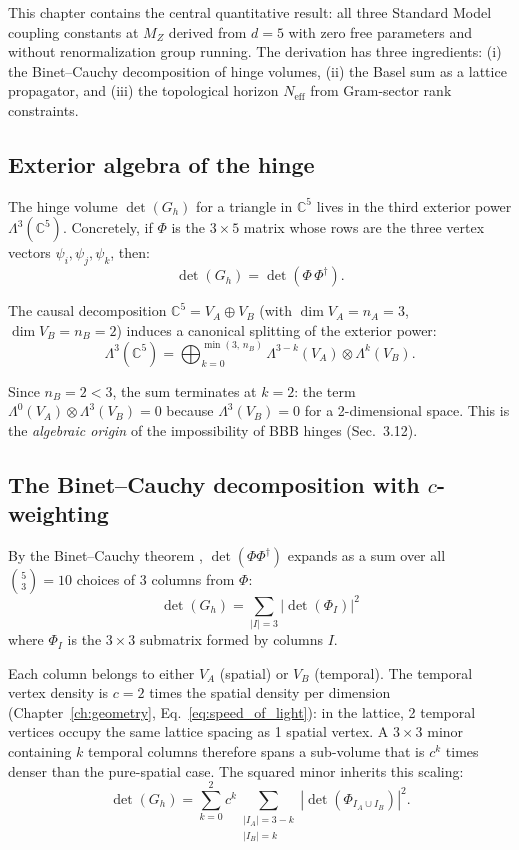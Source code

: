 \documentclass[12pt]{article}
\theoremstyle{remark}
\theoremstyle{definition}
\newcommand{\CC}{\mathbb{C}}
\begin{document}
This chapter contains the central quantitative result: all three Standard Model coupling constants at $M_Z$ derived from $d = 5$ with zero free parameters and without renormalization group running. The derivation has three ingredients: (i) the Binet--Cauchy decomposition of hinge volumes, (ii) the Basel sum as a lattice propagator, and (iii) the topological horizon $N_\text{eff}$ from Gram-sector rank constraints.

\subsection{Exterior algebra of the hinge}

The hinge volume $\det(G_h)$ for a triangle in $\CC^5$ lives in the third exterior power $\Lambda^3(\CC^5)$. Concretely, if $\Phi$ is the $3 \times 5$ matrix whose rows are the three vertex vectors $\psi_i, \psi_j, \psi_k$, then:
\begin{equation}
\det(G_h) = \det(\Phi\,\Phi^\dagger).
\end{equation}

The causal decomposition $\CC^5 = V_A \oplus V_B$ (with $\dim V_A = n_A = 3$, $\dim V_B = n_B = 2$) induces a canonical splitting of the exterior power:
\begin{equation}
\Lambda^3(\CC^5) = \bigoplus_{k=0}^{\min(3,\,n_B)} \Lambda^{3-k}(V_A) \otimes \Lambda^k(V_B).
\label{eq:exterior_split}
\end{equation}

Since $n_B = 2 < 3$, the sum terminates at $k = 2$: the term $\Lambda^0(V_A) \otimes \Lambda^3(V_B) = 0$ because $\Lambda^3(V_B) = 0$ for a 2-dimensional space. This is the \emph{algebraic origin} of the impossibility of BBB hinges (Sec.~3.12).

\subsection{The Binet--Cauchy decomposition with $c$-weighting}

By the Binet--Cauchy theorem \cite{BinetCauchy}, $\det(\Phi\Phi^\dagger)$ expands as a sum over all $\binom{5}{3} = 10$ choices of 3 columns from $\Phi$:
\begin{equation}
\det(G_h) = \sum_{|I| = 3} |\det(\Phi_I)|^2
\end{equation}
where $\Phi_I$ is the $3 \times 3$ submatrix formed by columns $I$.

Each column belongs to either $V_A$ (spatial) or $V_B$ (temporal). The temporal vertex density is $c = 2$ times the spatial density per dimension (Chapter~\ref{ch:geometry}, Eq.~\ref{eq:speed_of_light}): in the lattice, 2 temporal vertices occupy the same lattice spacing as 1 spatial vertex. A $3 \times 3$ minor containing $k$ temporal columns therefore spans a sub-volume that is $c^k$ times denser than the pure-spatial case. The squared minor inherits this scaling:
\begin{equation}
\det(G_h) = \sum_{k=0}^{2} c^k \sum_{\substack{|I_A| = 3-k \\ |I_B| = k}} |\det(\Phi_{I_A \cup I_B})|^2.
\label{eq:BC_expansion}
\end{equation}
\end{document}
